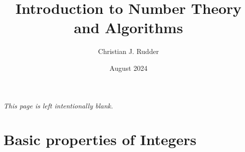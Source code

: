 \documentclass{memoir}
\title{Introduction to Number Theory and Algorithms}
\author{Christian J. Rudder}
\date{August 2024}
\begin{document}
\maketitle

\tableofcontents

\newpage
\thispagestyle{empty}
\mbox{}
\vfill
\begin{center}
    \textit{This page is left intentionally blank.}
\end{center}
\vfill
\newpage




\chapter{Basic properties of Integers}




\end{document}
